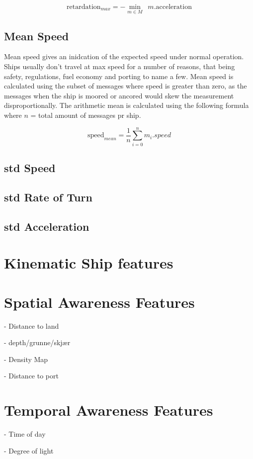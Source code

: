 $$
\mathrm{retardation}_{max} = - \min_{m \in M}\;\:{m.\mathrm{acceleration}}
$$

\subsection{Mean Speed}
Mean speed gives an inidcation of the expected speed under normal operation. Ships usually don't travel at max speed for a number of reasons, that being safety, regulations, fuel economy and porting to name a few. Mean speed is calculated using the subset of messages where speed is greater than zero, as the messages when the ship is moored or ancored would skew the measurement disproportionally. The arithmetic mean is calculated using the following formula where $n$ = total amount of messages pr ship. 

$$
\mathrm{speed}_{mean} = \dfrac{1}{n}\sum_{i=0}^{n}{m_i.speed}
$$

\subsection{std Speed}
\subsection{std Rate of Turn}
\subsection{std Acceleration}



\section{Kinematic Ship features}
\begin{info}{}
\end{info}




\section{Spatial Awareness Features}
\begin{info}{}
\end{info}

- Distance to land

- depth/grunne/skjær

- Density Map

- Distance to port

\section{Temporal Awareness Features}
\begin{info}{}
\end{info}

- Time of day

- Degree of light


